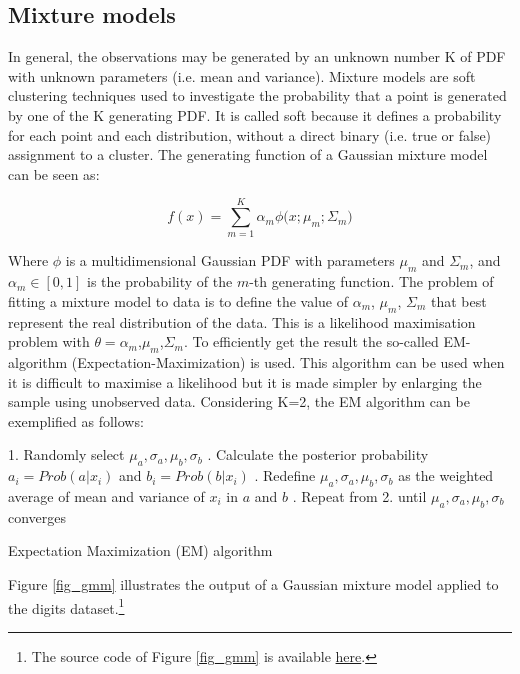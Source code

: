 \subsection{Mixture models} 
In general, the observations may be generated by an unknown number K of PDF with unknown parameters (i.e. mean and variance). Mixture models are soft clustering techniques used to investigate the probability that a point is generated by one of the K generating PDF. It is called soft because it defines a probability for each point and each distribution, without a direct binary (i.e. true or false) assignment to a cluster. The generating function of a Gaussian mixture model can be seen as:

\begin{equation}
f\left(x\right)=\sum_{m=1}^{K}{\alpha_m\phi(x;\mu_m;\Sigma_m})
\label{eq_gmm}
\end{equation}

Where $\phi$ is a multidimensional Gaussian PDF with parameters $\mu_m$ and $\Sigma_m$, and $\alpha_m\in[0,1]$ is the probability of the $m$-th generating function. The problem of fitting a mixture model to data is to define the value of $\alpha_m$, $\mu_m$, $\Sigma_m$ that best represent the real distribution of the data. This is a likelihood maximisation problem with $\theta=\alpha_m$,$\mu_m$,$\Sigma_m$. To efficiently get the result the so-called EM-algorithm (Expectation-Maximization) is used. This algorithm can be used when it is difficult to maximise a likelihood but it is made simpler by enlarging the sample using unobserved data. Considering K=2, the EM algorithm can be exemplified as follows:

\begin{algorithm}[H]
\DontPrintSemicolon
\SetAlgoLined
    
    1. Randomly select $\mu_a,\sigma_a,\mu_b,\sigma_b$ . Calculate the posterior probability $a_i=Prob(a|x_i)$ and $b_i=Prob(b|x_i)$ . Redefine $\mu_a,\sigma_a,\mu_b,\sigma_b$ as the weighted average of mean and variance of $x_i$ in $a$ and $b$ . Repeat from 2. until $\mu_a,\sigma_a,\mu_b,\sigma_b$ converges\;
    
    
    
   
\caption{Expectation Maximization (EM) algorithm}
\label{algo_EM}        
\end{algorithm}

Figure \ref{fig_gmm} illustrates the output of a Gaussian mixture model applied to the digits dataset.\footnote{The source code of Figure \ref{fig_gmm} is available \href{https://github.com/aletuf93/logproj/blob/master/examples/06.\%20Unsupervised\%20learning.ipynb}{here}.}

